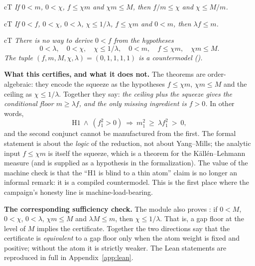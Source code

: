 \begin{claimbox}{cT}
 \emph{If $0<m$, $0<\chi$, $f\le\chi m$ and
$\chi m\le M$, then $f/m\le\chi$ and $\chi\le M/m$.}
\end{claimbox}

\begin{claimbox}{cT}
 \emph{If $0<f$, $0<\chi$, $0<\lambda$,
$\chi\le1/\lambda$, $f\le\chi m$ and $0<m$, then $\lambda f\le m$.}
\end{claimbox}

\begin{claimbox}{cT}
 \emph{There is no way to derive
$0<f$ from the hypotheses}
\[
0<\lambda,\quad 0<\chi,\quad \chi\le1/\lambda,\quad 0<m,\quad f\le\chi m,\quad \chi m\le M .
\]
\emph{The tuple $(f,m,M,\chi,\lambda)=(0,1,1,1,1)$ is a countermodel
().}
\end{claimbox}
\label{thm:leanblind}

\textbf{What this certifies, and what it does not.} The theorems are order-algebraic: they
encode the squeeze as the hypotheses $f\le\chi m$, $\chi m\le M$ and the ceiling as
$\chi\le1/\lambda$. Together they say: \emph{the ceiling plus the squeeze gives the conditional
floor $m\ge\lambda f$, and the only missing ingredient is $f>0$.} In other words,
\[
\mathrm{H1}\ \wedge\ (f_1^2>0)\ \Longrightarrow\ m_1^2\ \ge\ \lambda f_1^2\ >\ 0,
\]
and the second conjunct cannot be manufactured from the first. The formal statement is about the
\emph{logic} of the reduction, not about Yang--Mills; the analytic input $f\le\chi m$ is itself
the squeeze, which is a theorem for the K\"all\'en--Lehmann measure (and is supplied as a
hypothesis in the formalization). The value of the machine check is that the ``H1 is blind to a
thin atom'' claim is no longer an informal remark: it is a compiled countermodel. This is the
first place where the campaign's honesty line is machine-load-bearing.

\textbf{The corresponding sufficiency check.} The module also proves :
if $0<M$, $0<\chi$, $0<\lambda$, $\chi m\le M$ and $\lambda M\le m$, then $\chi\le1/\lambda$.
That is, a gap floor at the level of $M$ implies the certificate. Together the two directions say
that the certificate is \emph{equivalent} to a gap floor only when the atom weight is fixed and
positive; without the atom it is strictly weaker. The Lean statements are reproduced in full in
Appendix~\ref{app:lean}.

